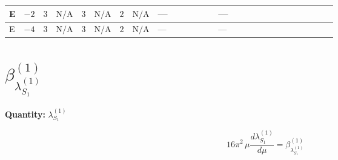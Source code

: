 \documentclass[8pt]{article}
\begin{document}
\begin{landscape}
\begin{longtable}{@{}llcccccc >{\raggedright\arraybackslash}p{0.21\linewidth} >{\raggedright\arraybackslash}p{0.21\linewidth} >{\raggedright\arraybackslash}p{0.21\linewidth}@{}}
\midrule
E & $-2$ & $3$ & $\text{N/A}$ & $3$ & $\text{N/A}$ & $2$ & $\text{N/A}$ & --- & --- & \scriptsize\adjustbox{max width=\linewidth}{$\begin{gathered} +3 {\lambda_{HS_1}^{(A)}}^2\end{gathered}$} \\
\midrule
E & $-4$ & $3$ & $\text{N/A}$ & $3$ & $\text{N/A}$ & $2$ & $\text{N/A}$ & --- & --- & \scriptsize\adjustbox{max width=\linewidth}{$\begin{gathered} +3 {\lambda_{HS_1}^{(A)}}^2\end{gathered}$} \\
\midrule
\bottomrule
\end{longtable}
\clearpage
\section*{$\beta_{\lambda_{S_1}^{(1)}}^{(1)}$}
\noindent\textbf{Quantity: }$\lambda_{S_1}^{(1)}$\par\smallskip
\[16\pi^2\,\mu\frac{d \lambda_{S_1}^{(1)}}{d\mu}=\beta_{\lambda_{S_1}^{(1)}}^{(1)}\]

\end{landscape}
\end{document}
